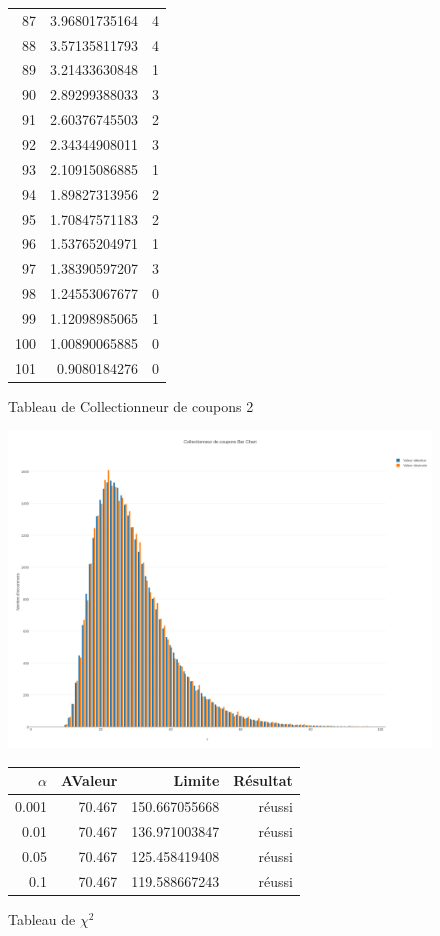 \documentclass[10pt,a4paper]{article}
\begin{document}
\begin{figure}[h]
\begin{tabular}{|r|r|r|}
87 & 3.96801735164 & 4\\
88 & 3.57135811793 & 4\\
89 & 3.21433630848 & 1\\
90 & 2.89299388033 & 3\\
91 & 2.60376745503 & 2\\
92 & 2.34344908011 & 3\\
93 & 2.10915086885 & 1\\
94 & 1.89827313956 & 2\\
95 & 1.70847571183 & 2\\
96 & 1.53765204971 & 1\\
97 & 1.38390597207 & 3\\
98 & 1.24553067677 & 0\\
99 & 1.12098985065 & 1\\
100 & 1.00890065885 & 0\\
101 & 0.9080184276 & 0\\
\hline
\end{tabular}
\caption{Tableau de Collectionneur de coupons 2}
\end{figure}

\begin{figure}[h]
\centering
\includegraphics[scale=0.25]{../chart_images/collectionneur_de_coupons_bar_chart.png}
\end{figure}

\begin{figure}[h]
\centering
\begin{tabular}{|r|r|r|r|}
\hline
$\alpha$ & AValeur & Limite & Résultat\\
\hline
0.001 & 70.467 & 150.667055668 & réussi\\
0.01 & 70.467 & 136.971003847 & réussi\\
0.05 & 70.467 & 125.458419408 & réussi\\
0.1 & 70.467 & 119.588667243 & réussi\\
\hline
\end{tabular}
\caption{Tableau de $\chi^2$}
\end{figure}
\end{document}
